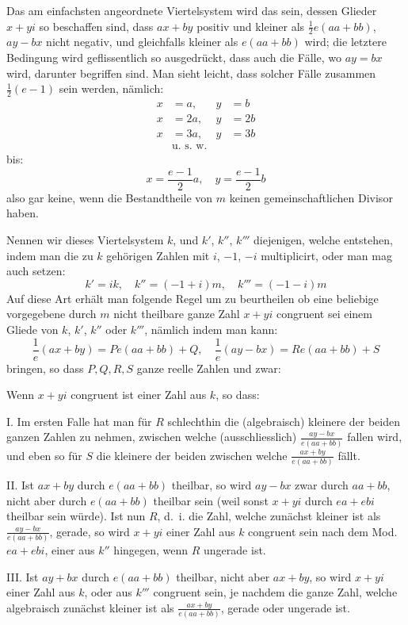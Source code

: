 \documentclass[12pt,a4paper]{article}
\begin{document}
Das am einfachsten angeordnete Viertelsystem wird das sein, dessen Glieder $x + yi$ so beschaffen sind, dass $ax + by$ positiv und kleiner als $\frac{1}{2}e(aa + bb)$, $ay - bx$ nicht negativ, und gleichfalls kleiner als $e(aa + bb)$ wird; die letztere Bedingung wird geflissentlich so ausgedrückt, dass auch die Fälle, wo $ay = bx$ wird, darunter begriffen sind. Man sieht leicht, dass solcher Fälle zusammen $\frac{1}{2}(e-1)$ sein werden, nämlich:
\begin{align*}
x &= a, & y &= b\\
x &= 2a, & y &= 2b\\
x &= 3a, & y &= 3b\\
&\text{u.~s.~w.}
\end{align*}
bis:
\[
x = \frac{e-1}{2}a, \quad y = \frac{e-1}{2}b
\]
also gar keine, wenn die Bestandtheile von $m$ keinen gemeinschaftlichen Divisor haben.

Nennen wir dieses Viertelsystem $k$, und $k'$, $k''$, $k'''$ diejenigen, welche entstehen, indem man die zu $k$ gehörigen Zahlen mit $i$, $-1$, $-i$ multiplicirt, oder man mag auch setzen:
\[
k' = ik, \quad k'' = (-1+i)m, \quad k''' = (-1-i)m
\]
Auf diese Art erhält man folgende Regel um zu beurtheilen ob eine beliebige vorgegebene durch $m$ nicht theilbare ganze Zahl $x + yi$ congruent sei einem Gliede von $k$, $k'$, $k''$ oder $k'''$, nämlich indem man kann:
\[
\frac{1}{e}(ax + by) = Pe(aa + bb) + Q, \quad \frac{1}{e}(ay - bx) = Re(aa + bb) + S
\]
bringen, so dass $P, Q, R, S$ ganze reelle Zahlen und zwar:

Wenn $x + yi$ congruent ist einer Zahl aus $k$, so dass:

I. Im ersten Falle hat man für $R$ schlechthin die (algebraisch) kleinere der beiden ganzen Zahlen zu nehmen, zwischen welche (ausschliesslich) $\frac{ay - bx}{e(aa + bb)}$ fallen wird, und eben so für $S$ die kleinere der beiden zwischen welche $\frac{ax + by}{e(aa + bb)}$ fällt.

II. Ist $ax + by$ durch $e(aa + bb)$ theilbar, so wird $ay - bx$ zwar durch $aa + bb$, nicht aber durch $e(aa + bb)$ theilbar sein (weil sonst $x + yi$ durch $ea + ebi$ theilbar sein würde). Ist nun $R$, d.~i. die Zahl, welche zunächst kleiner ist als $\frac{ay - bx}{e(aa + bb)}$, gerade, so wird $x + yi$ einer Zahl aus $k$ congruent sein nach dem Mod.~$ea + ebi$, einer aus $k''$ hingegen, wenn $R$ ungerade ist.

III. Ist $ay + bx$ durch $e(aa + bb)$ theilbar, nicht aber $ax + by$, so wird $x + yi$ einer Zahl aus $k$, oder aus $k'''$ congruent sein, je nachdem die ganze Zahl, welche algebraisch zunächst kleiner ist als $\frac{ax + by}{e(aa + bb)}$, gerade oder ungerade ist.
\end{document}
